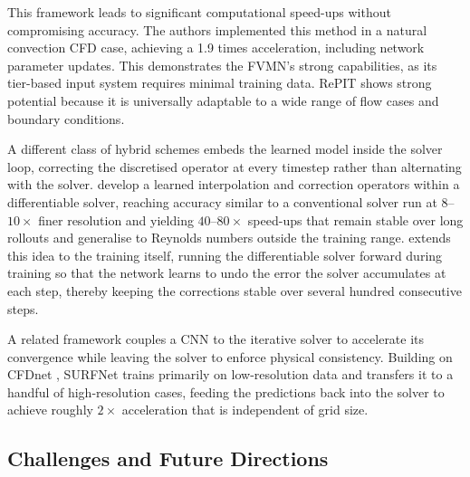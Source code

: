 This framework leads to significant computational speed-ups without compromising accuracy. The authors implemented this method in a natural convection CFD case, achieving a 1.9 times acceleration, including network parameter updates. This demonstrates the FVMN's strong capabilities, as its tier-based input system requires minimal training data. RePIT shows strong potential because it is universally adaptable to a wide range of flow cases and boundary conditions. 


A different class of hybrid schemes embeds the learned model inside the solver loop, correcting the discretised operator at every timestep rather than alternating with the solver. \textcite{Kochkov2021} develop a learned interpolation and correction operators within a differentiable solver, reaching accuracy similar to a conventional solver run at $8$--$10\times$ finer resolution and yielding $40$--$80\times$ speed-ups that remain stable over long rollouts and generalise to Reynolds numbers outside the training range. \textcite{Um2021} extends this idea to the training itself, running the differentiable solver forward during training so that the network learns to undo the error the solver accumulates at each step, thereby keeping the corrections stable over several hundred consecutive steps.

A related framework couples a CNN to the iterative solver to accelerate its convergence while leaving the solver to enforce physical consistency. Building on CFDnet \cite{Obiols-Sales2021}, SURFNet \cite{Obiols-Sales2021} trains primarily on low-resolution data and transfers it to a handful of high-resolution cases, feeding the predictions back into the solver to achieve roughly $2\times$ acceleration that is independent of grid size.



\subsection{Challenges and Future Directions}

